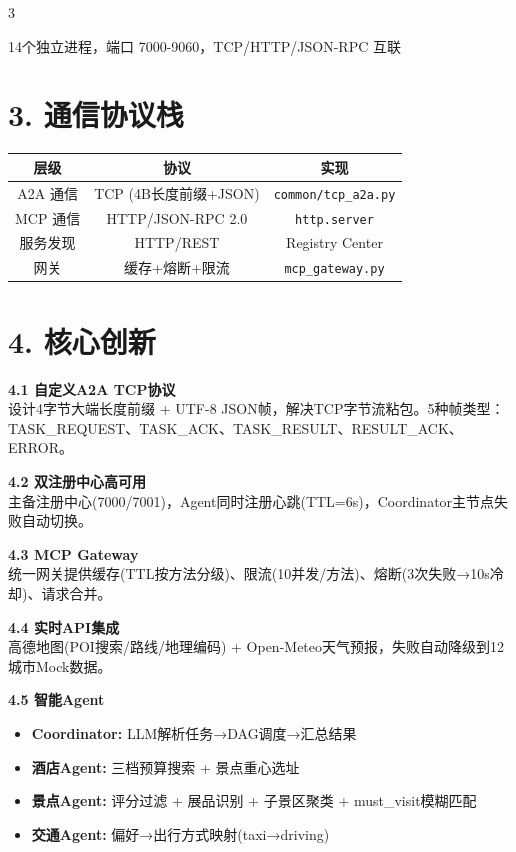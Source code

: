 \documentclass[final]{beamer}
\begin{document}
\begin{frame}[t]
\begin{multicols}{3}
\begin{center}
\begin{tikzpicture}
\end{tikzpicture}
\end{center}
{\footnotesize\centering 14个独立进程，端口 7000-9060，TCP/HTTP/JSON-RPC 互联}

\vspace{0.3cm}
\section*{\color{mainblue}3. 通信协议栈}
\centering
\begin{tabular}{c|c|c}
\toprule
\textbf{层级} & \textbf{协议} & \textbf{实现}\\
\midrule
A2A 通信 & TCP (4B长度前缀+JSON) & \texttt{common/tcp\_a2a.py}\\
MCP 通信 & HTTP/JSON-RPC 2.0 & \texttt{http.server}\\
服务发现 & HTTP/REST & Registry Center\\
网关 & 缓存+熔断+限流 & \texttt{mcp\_gateway.py}\\
\bottomrule
\end{tabular}


\section*{\color{mainblue}4. 核心创新}

\textbf{4.1 自定义A2A TCP协议}\\
设计4字节大端长度前缀 + UTF-8 JSON帧，解决TCP字节流粘包。5种帧类型：TASK\_REQUEST、TASK\_ACK、TASK\_RESULT、RESULT\_ACK、ERROR。

\textbf{4.2 双注册中心高可用}\\
主备注册中心(7000/7001)，Agent同时注册心跳(TTL=6s)，Coordinator主节点失败自动切换。

\textbf{4.3 MCP Gateway}\\
统一网关提供缓存(TTL按方法分级)、限流(10并发/方法)、熔断(3次失败→10s冷却)、请求合并。

\textbf{4.4 实时API集成}\\
高德地图(POI搜索/路线/地理编码) + Open-Meteo天气预报，失败自动降级到12城市Mock数据。

\textbf{4.5 智能Agent}\\
\begin{itemize}[leftmargin=*]
    \item \textbf{Coordinator:} LLM解析任务→DAG调度→汇总结果
    \item \textbf{酒店Agent:} 三档预算搜索 + 景点重心选址
    \item \textbf{景点Agent:} 评分过滤 + 展品识别 + 子景区聚类 + must\_visit模糊匹配
    \item \textbf{交通Agent:} 偏好→出行方式映射(taxi→driving)
\end{itemize}


\end{multicols}
\end{frame}
\end{document}
